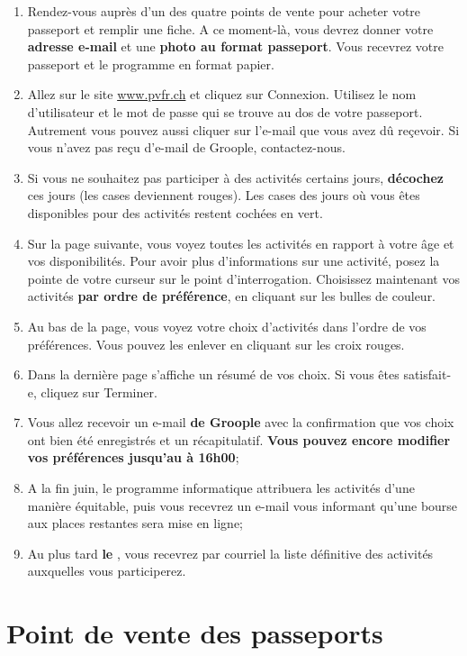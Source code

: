\begin{enumerate}
\item Rendez-vous auprès d'un des quatre points de vente pour acheter votre passeport et remplir une fiche. A ce moment-là,
vous devrez donner votre \textbf{adresse e-mail} et une \textbf{photo au format passeport}. Vous recevrez votre
passeport et le programme  en format papier.
\item Allez sur le site \url{www.pvfr.ch} et cliquez sur \og{}Connexion\fg{}. Utilisez le nom d'utilisateur et le mot de passe
qui se trouve au dos de votre passeport. Autrement vous pouvez aussi cliquer sur l'e-mail que vous avez dû reçevoir.
Si vous n'avez pas reçu d'e-mail de Groople, contactez-nous.
\item Si vous ne souhaitez pas participer à des activités certains jours, \textbf{décochez} ces jours (les cases
deviennent rouges). Les cases des jours où vous êtes disponibles pour des activités restent cochées en vert.
\item Sur la page suivante, vous voyez toutes les activités en rapport à votre âge et vos disponibilités. Pour avoir
plus d'informations sur une activité, posez la pointe de votre curseur sur le point d'interrogation. Choisissez
maintenant vos activités \textbf{par ordre de préférence}, en cliquant sur les bulles de couleur.
\item Au bas de la page, vous voyez votre choix d'activités dans l'ordre de vos préférences. Vous pouvez les enlever en
cliquant sur les croix rouges.
\item Dans la dernière page s'affiche un résumé de vos choix. Si vous êtes satisfait-e, cliquez sur \og{}Terminer\fg{}.
\item Vous allez recevoir un e-mail \textbf{de Groople} avec la confirmation que vos choix ont bien été enregistrés et
un récapitulatif. \textbf{Vous pouvez encore modifier vos préférences jusqu'au  à 16h00};
\item A la fin juin, le programme informatique attribuera les activités d'une manière équitable, puis vous recevrez un
e-mail vous informant qu'une bourse aux places restantes sera mise en ligne;
\item Au plus tard \textbf{le }, vous recevrez par courriel la liste définitive des activités auxquelles vous
participerez.
\end{enumerate}

\section*{Point de vente des passeports}
